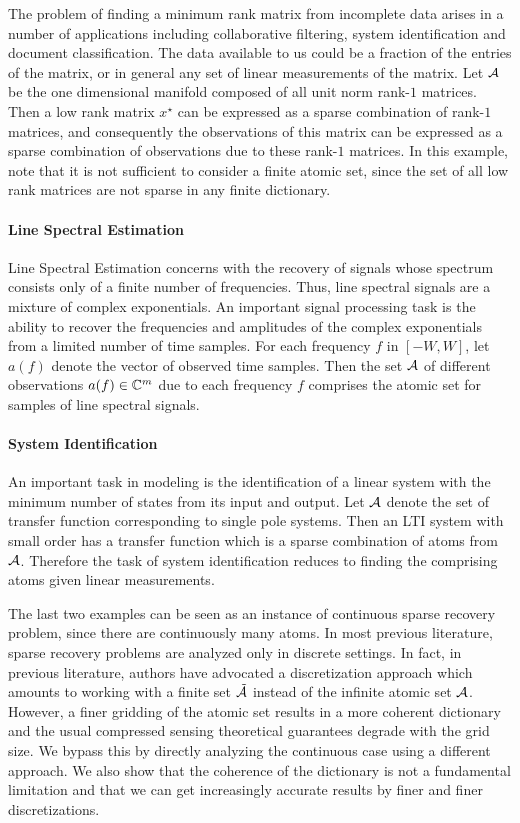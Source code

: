 The problem of finding a minimum rank matrix from incomplete data arises in a
number of applications including collaborative filtering, system identification
and document classification. The data available to us could be a fraction of the
entries of the matrix, or in general any set of linear measurements of the
matrix. Let $\mathcal{A}$ be the one dimensional manifold composed of all unit norm
rank-$1$ matrices. Then a low rank matrix $x^\star$ can be expressed as a sparse
combination of rank-$1$ matrices, and consequently the observations of this
matrix can be expressed as a sparse combination of observations due to these
rank-$1$ matrices. In this example, note that it is not sufficient to consider a
finite atomic set, since the set of all low rank matrices are not sparse in any finite dictionary.

\paragraph{Line Spectral Estimation} Line Spectral Estimation concerns with the
recovery of signals whose spectrum consists only of a finite number of
frequencies. Thus, line spectral signals are a mixture of complex exponentials.
An important signal processing task is the ability to recover the frequencies
and amplitudes of the complex exponentials from a limited number of time
samples. For each frequency $f$ in $[-W,W]$, let $a(f)$ denote the vector of
observed time samples. Then the set $\mathcal{A}$ of different observations $a(f) \in
\mathbb{C}^m$ due to each frequency $f$ comprises the atomic set for samples of line
spectral signals.

\paragraph{System Identification} An important task in modeling is the
identification of a linear system with the minimum number of states from
its input and output. Let $\mathcal{A}$ denote the set of transfer function
corresponding to single pole systems. Then an LTI system with small order has
a transfer function which is a sparse combination of atoms from $\mathcal{A}$. Therefore the task of system identification reduces to finding the comprising atoms given linear measurements.

The last two examples can be seen as an instance of continuous sparse recovery
problem, since there are continuously many atoms. In most previous literature,
sparse recovery problems are analyzed only in discrete settings. In fact, in
previous literature, authors have advocated a discretization approach which
amounts to working with a finite set $\tilde{\mathcal{A}}$ instead of the infinite atomic
set $\mathcal{A}$. However, a finer gridding of the atomic set results in a more coherent
dictionary and the usual compressed sensing theoretical guarantees degrade with
the grid size. We bypass this by directly analyzing the continuous case using a
different approach. We also show that the coherence of the dictionary is not a
fundamental limitation and that we can get increasingly accurate results by
finer and finer discretizations. 

